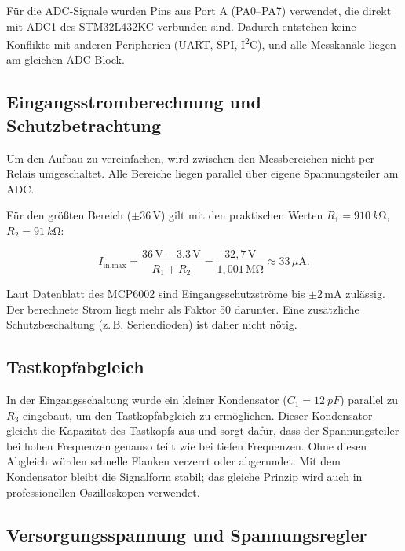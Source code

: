 \documentclass{article}
\begin{document}
	Für die ADC-Signale wurden Pins aus Port A (PA0–PA7) verwendet, die direkt mit ADC1 des STM32L432KC verbunden sind.  
	Dadurch entstehen keine Konflikte mit anderen Peripherien (UART, SPI, I\textsuperscript{2}C), und alle Messkanäle liegen am gleichen ADC-Block.
	
	\subsection*{Eingangsstromberechnung und Schutzbetrachtung}
	
	Um den Aufbau zu vereinfachen, wird zwischen den Messbereichen nicht per Relais umgeschaltet.  
	Alle Bereiche liegen parallel über eigene Spannungsteiler am ADC.
	
	Für den größten Bereich (\(\pm 36\,\mathrm{V}\)) gilt mit den praktischen Werten
	\(R_1 = \SI{910}{k\ohm}\), \(R_2 = \SI{91}{k\ohm}\):
	
	\[
	I_{\text{in,max}} = \frac{36\,\mathrm{V} - 3.3\,\mathrm{V}}{R_1 + R_2}
	= \frac{32{,}7\,\mathrm{V}}{1{,}001\,\mathrm{M\Omega}}
	\approx 33\,\mu\mathrm{A}.
	\]
	
	Laut Datenblatt des MCP6002 sind Eingangsschutzströme bis \(\pm 2\,\mathrm{mA}\) zulässig.  
	Der berechnete Strom liegt mehr als Faktor 50 darunter.  
	Eine zusätzliche Schutzbeschaltung (z.\,B. Seriendioden) ist daher nicht nötig.
	
	\subsection{Tastkopfabgleich}
	
	In der Eingangsschaltung wurde ein kleiner Kondensator (\(C_1 = \SI{12}{pF}\)) parallel zu \(R_3\) eingebaut, um den Tastkopfabgleich zu ermöglichen.
	Dieser Kondensator gleicht die Kapazität des Tastkopfs aus und sorgt dafür, dass der Spannungsteiler bei hohen Frequenzen genauso teilt wie bei tiefen Frequenzen.
	Ohne diesen Abgleich würden schnelle Flanken verzerrt oder abgerundet.  
	Mit dem Kondensator bleibt die Signalform stabil; das gleiche Prinzip wird auch in professionellen Oszilloskopen verwendet.
	
	\subsection{Versorgungsspannung und Spannungsregler}
	
\end{document}
